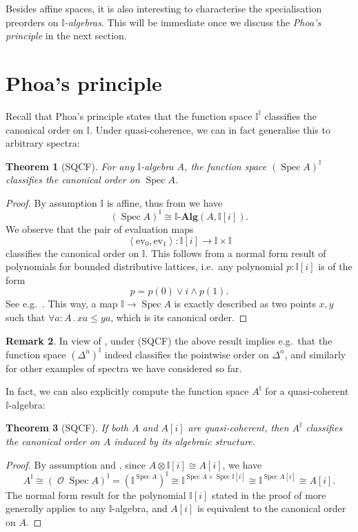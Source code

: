 \documentclass[a4paper,12pt]{amsart}
\newtheorem{theorem}{Theorem}[section]
\theoremstyle{definition}
\newtheorem{remark}[theorem]{Remark}
\newcommand{\mc}[1]{\mathcal{#1}}
\newcommand{\mb}[1]{\mathbf{#1}}
\newcommand{\mbb}[1]{\mathbb{#1}}
\newcommand{\I}{\mbb I}
\newcommand{\alg}{\text{-}\mb{Alg}}
\newcommand{\pair}[1]{\left\langle#1\right\rangle}
\newcommand{\ev}{\mathrm{ev}}
\newcommand{\fa}[2]{\forall #1\!\colon\!\!#2\mathpunct{.}}
\newcommand{\spec}{\operatorname{Spec}}
\newcommand{\opens}{\operatorname{\mc{O}}} %
\begin{document}
Besides affine spaces, it is also interesting to characterise the specialisation preorders on \emph{$\I$-algebras}. This will be immediate once we discuss the \emph{Phoa's principle} in the next section.

\section{Phoa's principle}

Recall that Phoa's principle states that the function space $\I^\I$ classifies the canonical order on $\I$. Under quasi-coherence, we can in fact generalise this to arbitrary spectra:

\begin{theorem}[SQCF]\label{thm:phoaaffine}
  For any $\I$-algebra $A$, the function space ${(\spec A)}^\I$ classifies the canonical order on $\spec A$.
\end{theorem}
\begin{proof}
  By assumption $\I$ is affine, thus from  we have
  \[ (\spec A)^\I \cong \I\alg(A,\I[i]). \]
  We observe that the pair of evaluation maps
  \[ \pair{\ev_0,\ev_1} : \I[i] \to \I \times \I \]
  classifies the canonical order on $\I$. This follows from a normal form result of polynomials for bounded distributive lattices, i.e.\ any polynomial $p:\I[i]$ is of the form 
  \[ p = p(0) \vee i \wedge p(1). \]
  See e.g.~\cite[Thm. 10.11]{lausch2000algebra}. This way, a map $\I \to \spec A$ is exactly described as two points $x,y$ such that $\fa aA xa \le ya$, which is its canonical order.
\end{proof}

\begin{remark}
  In view of , under (SQCF) the above result implies e.g.\ that the function space $(\Delta^n)^\I$ indeed classifies the pointwise order on $\Delta^n$, and similarly for other examples of spectra we have considered so far.
\end{remark}

In fact, we can also explicitly compute the function space $A^\I$ for a quasi-coherent $\I$-algebra:

\begin{theorem}[SQCF]\label{thm:algebraphoa}
  If both $A$ and $A[i]$ are quasi-coherent, then $A^\I$ classifies the canonical order on $A$ induced by its algebraic structure.
\end{theorem}
\begin{proof}
  By assumption and , since $A \otimes \I[i] \cong A[i]$, we have
  \[ A^\I \cong (\opens{\spec A})^\I = (\I^{\spec A})^\I \cong \I^{\spec A \times \spec\I[i]} \cong \I^{\spec A[i]} \cong A[i]. \]
  The normal form result for the polynomial $\I[i]$ stated in the proof of  more generally applies to any $\I$-algebra, and $A[i]$ is equivalent to the canonical order on $A$.
\end{proof}
\end{document}
